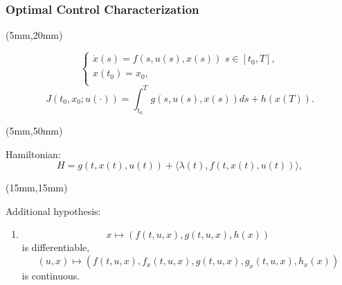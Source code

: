 \begin{frame}[plain]
\frametitle{Optimal Control Characterization}
\begin{textblock*}{120mm}(5mm,20mm)
	\begin{yellowbox}{}
		$$\left\{ \begin{array}{l}
		\dot{x}(s)=f(s,u(s),x(s))\,\,s\in [t_0,T], \\
		x(t_0)=x_0,\\
		\end{array}
		\right.$$			
		$$J(t_0,x_0;u(\cdot))=\int_{t_0}^{T}g(s,u(s),x(s))ds+h(x(T)).$$
	\end{yellowbox}
\end{textblock*}

	\begin{textblock*}{75mm}(5mm,50mm)
		\begin{greenbox}{Hamiltonian:}
			\begin{equation*}
			H=g(t,x(t),u(t))+\langle \lambda(t),f(t,x(t),u(t))\rangle,
			\end{equation*}
		\end{greenbox}
	\end{textblock*}
\end{frame}
\begin{frame}[plain]
	\begin{textblock*}{100mm}(15mm,15mm)
		\begin{graybox}{Additional hypothesis:}
			\begin{enumerate}[(\textbf{{C}}-4)]
				\item
				$$
					x \mapsto (f(t,u,x),g(t,u,x),h(x))
				$$
				is differentiable,
				$$
				(u,x) \mapsto (f(t,u,x),f_x(t,u,x),g(t,u,x),g_x(t,u,x),h_x(x))
				$$
				is continuous.				
			\end{enumerate}	
		\end{graybox}
	\end{textblock*}
\end{frame}
